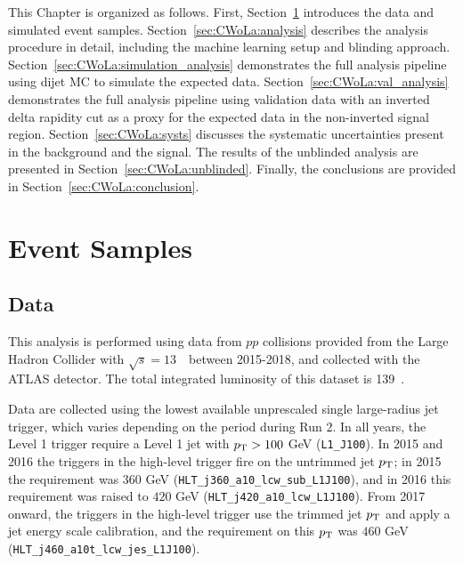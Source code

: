 This Chapter is organized as follows.
First, Section~\ref{sec:CWoLa:eventsamples} introduces the data and simulated event samples.
Section~\ref{sec:CWoLa:analysis} describes the analysis procedure in detail, including the machine learning setup and blinding approach.
Section~\ref{sec:CWoLa:simulation_analysis} demonstrates the full analysis pipeline using dijet MC to simulate the expected data.
Section~\ref{sec:CWoLa:val_analysis} demonstrates the full analysis pipeline using validation data with an inverted delta rapidity cut as a proxy for the expected data in the non-inverted signal region.
Section~\ref{sec:CWoLa:systs} discusses the systematic uncertainties present in the background and the signal.
The results of the unblinded analysis are presented in Section~\ref{sec:CWoLa:unblinded}.
Finally, the conclusions are provided in Section~\ref{sec:CWoLa:conclusion}.

\section{Event Samples}
\label{sec:CWoLa:eventsamples}


\subsection{Data}
\label{sec:CWoLa:data}

This analysis is performed using data from $pp$ collisions provided from the Large Hadron Collider with $\sqrt{s} = 13$~\TeV~between 2015-2018, and collected with the ATLAS detector. The total integrated luminosity of this dataset is 139~\ifb.

Data are collected using the lowest available unprescaled single large-radius jet trigger, which varies depending on the period during Run 2.
In all years, the Level 1 trigger require a Level 1 jet with $p_{\text{T}}>100$ GeV (\texttt{L1\_J100}).
In 2015 and 2016 the triggers in the high-level trigger fire on the untrimmed jet $p_{\text{T}}$; in 2015 the requirement was $360$ GeV (\texttt{HLT\_j360\_a10\_lcw\_sub\_L1J100}), and in 2016 this requirement was raised to $420$ GeV (\texttt{HLT\_j420\_a10\_lcw\_L1J100}).
From 2017 onward, the triggers in the high-level trigger use the trimmed jet $p_{\text{T}}$ and apply a jet energy scale calibration, and the requirement on this $p_{\text{T}}$ was $460$ GeV (\texttt{HLT\_j460\_a10t\_lcw\_jes\_L1J100}).

